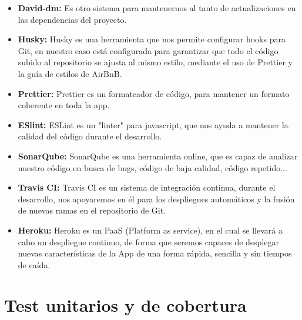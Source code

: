 \begin{itemize}
  \item \textbf{David-dm:} Es otro sistema para mantenernos al tanto de actualizaciones en las dependencias del proyecto.
  
  \item \textbf{Husky:} Husky es una herramienta que nos permite configurar \gls{hooks} para Git, en nuestro caso está configurada para garantizar que todo el código subido al repositorio se ajusta al mismo estilo, mediante el uso de Prettier y la guía de estilos de AirBnB.
  
  \item \textbf{Prettier:} Prettier es un formateador de código, para mantener un formato coherente en toda la app. 
    \item \textbf{ESlint:} ESLint es un "\gls{linter}" para javascript, que nos ayuda a mantener la calidad del código durante el desarrollo.
  
  \item \textbf{SonarQube:} SonarQube es una herramienta online, que es capaz de analizar nuestro código en busca de bugs, código de baja calidad, código repetido...
  
  \item \textbf{Travis CI:} Travis CI es un sistema de integración continua, durante el desarrollo, nos apoyaremos en él para los despliegues automáticos y la fusión de nuevas ramas en el repositorio de Git.
  
  \item \textbf{Heroku:} Heroku es un \gls{PaaS} (Platform as service), en el cual se llevará a cabo un despliegue continuo, de forma que seremos capaces de desplegar nuevas características de la App de una forma rápida, sencilla y sin tiempos de caída.

\end{itemize}
\section {Test unitarios y de cobertura}
